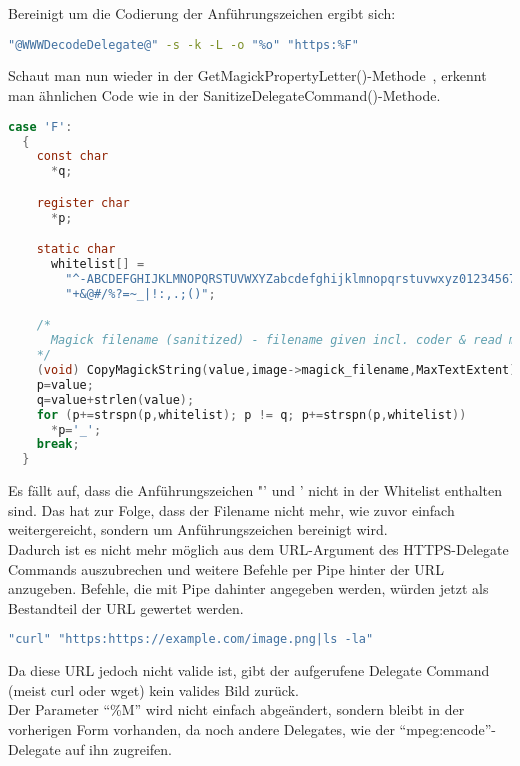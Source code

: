 Bereinigt um die Codierung der Anführungszeichen ergibt sich:\\

\begin{lstlisting}[firstnumber=1, language=Bash, caption=Aufgelöster https-Delegate-Befehl 6.9.3-10,label={lst:lstlisting}]
"@WWWDecodeDelegate@" -s -k -L -o "%o" "https:%F"
\end{lstlisting}
\vspace{5mm}

\newpage

Schaut man nun wieder in der GetMagickPropertyLetter()-Methode~\cite{ComareFParam},
erkennt man ähnlichen Code wie in der SanitizeDelegateCommand()-Methode.

\begin{lstlisting}[firstnumber=2610, language=C, caption=magick/property.c Gefilterte Wietergabe F-Parameter,label={lst:lstlisting}]
  case 'F':
  {
    const char
      *q;

    register char
      *p;

    static char
      whitelist[] =
        "^-ABCDEFGHIJKLMNOPQRSTUVWXYZabcdefghijklmnopqrstuvwxyz0123456789"
        "+&@#/%?=~_|!:,.;()";

    /*
      Magick filename (sanitized) - filename given incl. coder & read mods.
    */
    (void) CopyMagickString(value,image->magick_filename,MaxTextExtent);
    p=value;
    q=value+strlen(value);
    for (p+=strspn(p,whitelist); p != q; p+=strspn(p,whitelist))
      *p='_';
    break;
  }
\end{lstlisting}
\vspace{5mm}

Es fällt auf, dass die Anführungszeichen "' und ' nicht in der Whitelist enthalten sind.
Das hat zur Folge, dass der Filename nicht mehr, wie zuvor einfach weitergereicht, sondern um Anführungszeichen bereinigt wird.\\

Dadurch ist es nicht mehr möglich aus dem URL-Argument des HTTPS-Delegate Commands auszubrechen und weitere Befehle per Pipe hinter der URL anzugeben.
Befehle, die mit Pipe dahinter angegeben werden, würden jetzt als Bestandteil der URL gewertet werden.

\begin{lstlisting}[language=Bash, caption=Vereinfachtes Beispiel für HTTPS Delegate-Command nach dem Ersetzen der Platzhalter,label={lst:simpleexampleafter}]
"curl" "https:https://example.com/image.png|ls -la"
\end{lstlisting}
\vspace{5mm}

Da diese URL jedoch nicht valide ist, gibt der aufgerufene Delegate Command (meist curl oder wget) kein valides Bild zurück.\\

Der Parameter "`\%M"' wird nicht einfach abgeändert,
sondern bleibt in der vorherigen Form vorhanden, da noch andere Delegates, wie der "`mpeg:encode"'-Delegate auf ihn zugreifen.\\